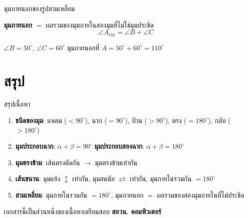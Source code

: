 \documentclass[11pt, aspectratio=169]{beamer}
\begin{document}
\begin{frame}{มุมภายนอกของรูปสามเหลี่ยม}
  \begin{explanation}
    \textbf{มุมภายนอก} $=$ ผลรวมของมุมภายในสองมุมที่ไม่ใช่มุมประชิด
    \[
      \angle A_{\text{ext}} = \angle B + \angle C
    \]
  \end{explanation}

  \begin{center}
  \end{center}

  \begin{exambox}[ตัวอย่าง]
    $\angle B = 50^\circ$, $\angle C = 60^\circ$ มุมภายนอกที่ $A = 50^\circ + 60^\circ = 110^\circ$
  \end{exambox}
\end{frame}

\section{สรุป}

\begin{frame}{สรุปเนื้อหา}
  \begin{explanation}[สิ่งที่ได้เรียนรู้]
    \begin{enumerate}
      \item \textbf{ชนิดของมุม}: แหลม ($< 90^\circ$), ฉาก ($= 90^\circ$), ป้าน ($> 90^\circ$), ตรง ($= 180^\circ$), กลับ ($> 180^\circ$)
      \item \textbf{มุมประกอบฉาก}: $\alpha + \beta = 90^\circ$ \quad \textbf{มุมประกอบสองฉาก}: $\alpha + \beta = 180^\circ$
      \item \textbf{มุมตรงข้าม}: เส้นตรงตัดกัน $\rightarrow$ มุมตรงข้ามเท่ากัน
      \item \textbf{เส้นขนาน}: มุมแย้ง $\updownarrow$ เท่ากัน, มุมสมนัย $\rightleftarrows$ เท่ากัน, มุมภายในรวมกัน $= 180^\circ$
      \item \textbf{สามเหลี่ยม}: มุมภายในรวมกัน $= 180^\circ$, มุมภายนอก $=$ ผลรวมของสองมุมภายในที่ไม่ประชิด
    \end{enumerate}
  \end{explanation}
  \begin{center}
    \large เอกสารนี้เป็นส่วนหนึ่งของเนื้อหาเตรียมสอบ \textbf{สอวน. คอมพิวเตอร์}
  \end{center}
\end{frame}
\end{document}
